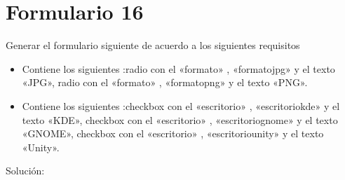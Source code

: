 \documentclass[letterpaper,10pt,spanish]{sphinxmanual}
\begin{document}
\section{Formulario 16}
\label{\detokenize{ejercicios/formularios/anexo_formularios:formulario-16}}
Generar el formulario siguiente de acuerdo a los siguientes requisitos
\begin{itemize}
\item {} 
Contiene los siguientes :radio con el   «formato» ,   «formatojpg»  y el texto «JPG», radio con el   «formato» ,   «formatopng»  y el texto «PNG».

\item {} 
Contiene los siguientes :checkbox con el   «escritorio» ,   «escritoriokde»  y el texto «KDE», checkbox con el   «escritorio» ,   «escritoriognome»  y el texto «GNOME», checkbox con el   «escritorio» ,   «escritoriounity»  y el texto «Unity».

\end{itemize}


Solución:
\end{document}
